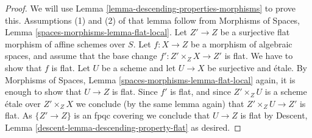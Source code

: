 \documentclass[10pt,a4paper]{amsart}
\theoremstyle{plain}
\theoremstyle{definition}
\theoremstyle{remark}
\numberwithin{equation}{subsection}
\begin{document}
\begin{proof}
We will use
Lemma \ref{lemma-descending-properties-morphisms}
to prove this. Assumptions (1) and (2) of that lemma follow from
Morphisms of Spaces,
Lemma \ref{spaces-morphisms-lemma-flat-local}.
Let $Z' \to Z$ be a surjective flat morphism of affine schemes over $S$.
Let $f : X \to Z$ be a morphism of algebraic spaces, and assume
that the base change $f' : Z' \times_Z X \to Z'$ is flat.
We have to show that $f$ is flat. Let $U$ be a scheme
and let $U \to X$ be surjective and \'etale. By
Morphisms of Spaces,
Lemma \ref{spaces-morphisms-lemma-flat-local}
again, it is enough to show that $U \to Z$ is flat.
Since $f'$ is flat, and since $Z' \times_Z U$ is a
scheme \'etale over $Z' \times_Z X$ we conclude (by the same lemma again) that
$Z' \times_Z U \to Z'$ is flat.
As $\{Z' \to Z\}$ is an fpqc covering we conclude that
$U \to Z$ is flat by
Descent, Lemma \ref{descent-lemma-descending-property-flat}
as desired.
\end{proof}
\end{document}
